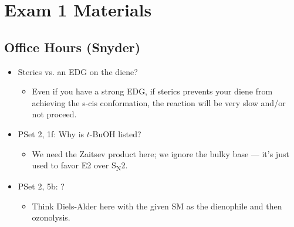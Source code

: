 \documentclass[../notes.tex]{subfiles}
\begin{document}
\chapter{Exam 1 Materials}
\section{Office Hours (Snyder)}
\begin{itemize}
    \item {}Sterics vs. an EDG on the diene?
    \begin{center}
        \footnotesize
    \end{center}
    \begin{itemize}
        \item Even if you have a strong EDG, if sterics prevents your diene from achieving the s-cis conformation, the reaction will be very slow and/or not proceed.
    \end{itemize}
    \item PSet 2, 1f: Why is $t$-BuOH listed?
    \begin{itemize}
        \item We need the Zaitsev product here; we ignore the bulky base --- it's just used to favor E2 over S\textsubscript{N}2.
    \end{itemize}
    \item PSet 2, 5b: ?
    \begin{itemize}
        \item Think Diels-Alder here with the given SM as the dienophile and then ozonolysis.
    \end{itemize}
\end{itemize}
\end{document}
